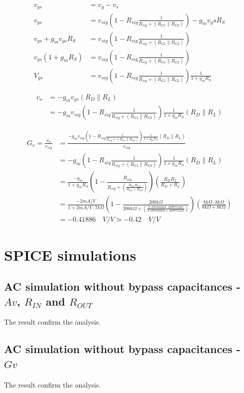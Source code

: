 \documentclass[10pt,a4paper]{book}
\begin{document}
\begin{align}
v_{gs} &= v_g - v_s\\
v_{gs} &= v_{sig} \left(1 - R_{sig} \frac{1}{R_{sig} + (R_{G1} \parallel R_{G2})}\right) - g_m v_gs R_S\\
v_{gs} + g_m v_{gs} R_S &= v_{sig} \left(1 - R_{sig} \frac{1}{R_{sig} + (R_{G1} \parallel R_{G2})}\right)\\
v_{gs} (1+ g_m R_S) &= v_{sig} \left(1 - R_{sig} \frac{1}{R_{sig} + (R_{G1} \parallel R_{G2})}\right)\\
V_{gs} &= v_{sig} \left(1 - R_{sig} \frac{1}{R_{sig} + (R_{G1} \parallel R_{G2})}\right) \frac{1}{1+ g_m R_S}
\end{align}

\begin{align}
v_o &= - g_m v_{gs} (R_D \parallel R_L)\\
&= -g_m v_{sig} \left(1 - R_{sig} \frac{1}{R_{sig} + (R_{G1} \parallel R_{G2})}\right) \frac{1}{1+ g_m R_S} (R_D \parallel R_L)
\end{align}

\begin{align}
G_v = \frac{v_o}{v_{sig}} &= \frac{-g_m v_{sig} \left(1 - R_{sig} \frac{1}{R_{sig} + (R_{G1} \parallel R_{G2})}\right) \frac{1}{1+ g_m R_S} (R_D \parallel R_L)}{v_{sig}}\\
&= -g_m \left(1 - R_{sig} \frac{1}{R_{sig} + (R_{G1} \parallel R_{G2})}\right) \frac{1}{1+ g_m R_S} (R_D \parallel R_L)\\
&= \frac{-g_m}{1+ g_m R_S} \left(1 - \frac{R_{sig}}{R_{sig} + \left(\frac{R_{G1}R_{G2}}{R_{G1}+R_{G2}}\right)}\right) \left(\frac{R_{D}R_{L}}{R_{D}+R_{L}}\right)\\
&= \frac{-2mA/V}{1+ 2mA/V \cdot 7k\Omega} \left(1 - \frac{200k\Omega}{200k\Omega + \left(\frac{2.19550M\Omega \cdot 1097752\Omega}{2.19550M\Omega +1097752\Omega}\right)}\right) \left(\frac{8k\Omega \cdot 8k\Omega}{8k\Omega + 8k\Omega}\right)\\
&= -0.41886 \quad V/V \simeq -0.42 \quad V/V
\end{align}

\clearpage
\section{SPICE simulations}

\subsection{AC simulation without bypass capacitances - $Av$, $R_{IN}$ and $R_{OUT}$}

The result confirm the analysis.


\subsection{AC simulation without bypass capacitances - $Gv$}

The result confirm the analysis.

\end{document}
